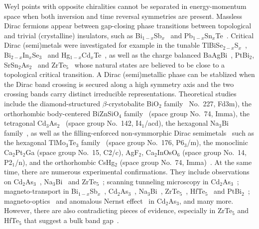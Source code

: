 Weyl points with opposite chiralities cannot be separated in energy-momentum space when both inversion and time reversal symmetries are present. Massless Dirac fermions appear between gap-closing phase transitions between topological and trivial (crystalline) insulators, such as Bi$_{1-x}$Sb$_x$~\cite{TeoFuKane08} and Pb$_{1-x}$Sn$_x$Te~\cite{Hsieh:2012fk}. Critical Dirac (semi)metals were investigated for example in the tunable TlBiSe$_{2-x}$S$_x$~\cite{SatoTakahashi11,SoumaAndo12,XuCavaHasan11}, Bi$_{2−x}$In$_x$Se$_3$~\cite{BrahlekSeongshik12,WuArmitage13} and Hg$_{1-x}$Cd$_x$Te~\cite{OrlitaPotemski14}, as well as the charge balanced BaAgBi~\cite{DuWanXYBi15}, PtBi$_2$, SrSn$_2$As$_2$~\cite{GibsonCava15} and ZrTe$_5$~\cite{LiVallaZrTe516} whose natural states are believed to be close to a topological critical transition. A Dirac (semi)metallic phase can be stablized when the Dirac band crossing is secured along a high symmetry axis and the two crossing bands carry distinct irreducible representations. Theoretical studies include the diamond-structured $\beta$-crystobalite BiO$_2$ family~\cite{BiO3_Dirac_semimetal} No.~227, Fd3m), the orthorhombic body-centered BiZnSiO$_4$ family~\cite{SteinbergYoungZaheerKaneMeleRappe14} (space group No.~74, Imma), the tetragonal Cd$_3$As$_2$~\cite{wangCd3As2PRB13} (space group No.~142, I4$_1$/acd), the hexagonal Na$_3$Bi family~\cite{Dai_predition_Na3Bi}, as well as the filling-enforced non-symmorphic Dirac semimetals~\cite{KonigMermin97,ParameswaranTurnerArovasVishwanath13,WatanabePoVishwanathZaletel15,ChenKimKee16,WatanabePoZaletelVishwanath16} such as the hexagonal TlMo$_3$Te$_3$ family~\cite{GibsonCava15} (space group No.~176, P6$_3$/m), the monoclinic Ca$_2$Pt$_2$Ga (space group No.~15, C2/c), AgF$_2$, Ca$_2$InOsO$_6$ (space group No.~14, P2$_1$/n), and the orthorhombic CsHg$_2$ (space group No.~74, Imma)~\cite{ChenPoNeatonVishwanath16}. At the same time, there are numerous experimental confirmations. They include \ARPES observations on Cd$_2$As$_3$~\cite{Cd3As2Chen2014,neupaneDiracHasan,borisenkoPRLCd3As2}, Na$_3$Bi~\cite{Liu21022014,Xu18122014} and ZrTe$_5$~\cite{LiVallaZrTe516}; scanning tunneling microscopy in Cd$_2$As$_3$~\cite{Yazdani_CdAs}; magneto-transport in Bi$_{1-x}$Sb$_x$~\cite{KimLiBiSb13}, Cd$_2$As$_3$~\cite{liangOngTransportCd3As2,HeLi14,XiangChen15,FengLuCd3As215,LiYuCd3As215,LiWangCd3As216,GuoLeeCd2As316,ZhangXiuCd3As217}, Na$_3$Bi~\cite{Xu18122014,XiongOng15}, ZrTe$_5$~\cite{ZhengMingliangZrTe514,LiVallaZrTe516,LiangOngHallZrTe516,YuanXiuZrTe516}, HfTe$_5$~\cite{WangWangHfTe516} and PtBi$_2$~\cite{GaoTianPtBi217}; magneto-optics~\cite{AkrapOrlitaCd2As316} and anomalous Nernst effect~\cite{LiangOngNernstCd3As217} in Cd$_2$As$_3$, and many more. However, there are also contradicting pieces of evidence, especially in ZrTe$_5$ and HfTe$_5$ that suggest a bulk band gap~\cite{WengDaiFangZrTe514,LiXingZrTe516,WuPanZrTe516,MoreschiniGrioniZrTe516,ManzoniCrepaldiZrTe516,ManzoniParmigianiZrTe517,FanZhouZrTe517}.
